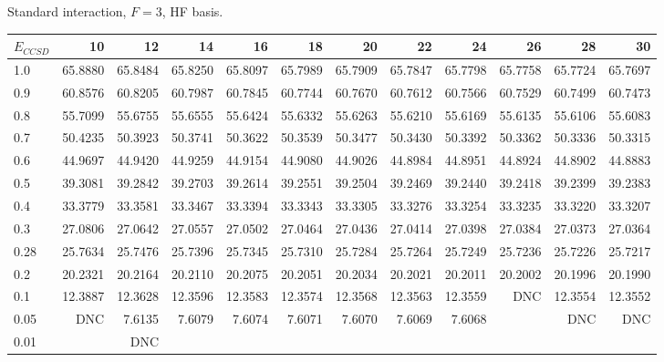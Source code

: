 \begin{landscape}
\begin{table}
\begin{center}
Standard interaction, $F=3$, HF basis.\\
\begin{tabular}{l|rrrrrrrrrrr}
\hline 
$E_{CCSD}$ & 10 & 12 & 14 & 16 & 18 & 20 & 22 & 24 & 26 & 28 & 30 \\
\hline \hline
1.0 & 65.8880 & 65.8484 & 65.8250 & 65.8097 & 65.7989 & 65.7909 & 65.7847 & 65.7798 & 65.7758 & 65.7724 & 65.7697 \\ 
0.9 & 60.8576 & 60.8205 & 60.7987 & 60.7845 & 60.7744 & 60.7670 & 60.7612 & 60.7566 & 60.7529 & 60.7499 & 60.7473 \\ 
0.8 & 55.7099 & 55.6755 & 55.6555 & 55.6424 & 55.6332 & 55.6263 & 55.6210 & 55.6169 & 55.6135 & 55.6106 & 55.6083 \\ 
0.7 & 50.4235 & 50.3923 & 50.3741 & 50.3622 & 50.3539 & 50.3477 & 50.3430 & 50.3392 & 50.3362 & 50.3336 & 50.3315 \\ 
0.6 & 44.9697 & 44.9420 & 44.9259 & 44.9154 & 44.9080 & 44.9026 & 44.8984 & 44.8951 & 44.8924 & 44.8902 & 44.8883 \\ 
0.5 & 39.3081 & 39.2842 & 39.2703 & 39.2614 & 39.2551 & 39.2504 & 39.2469 & 39.2440 & 39.2418 & 39.2399 & 39.2383 \\ 
0.4 & 33.3779 & 33.3581 & 33.3467 & 33.3394 & 33.3343 & 33.3305 & 33.3276 & 33.3254 & 33.3235 & 33.3220 & 33.3207 \\ 
0.3 & 27.0806 & 27.0642 & 27.0557 & 27.0502 & 27.0464 & 27.0436 & 27.0414 & 27.0398 & 27.0384 & 27.0373 & 27.0364 \\ 
0.28& 25.7634 & 25.7476 & 25.7396 & 25.7345 & 25.7310 & 25.7284 & 25.7264 & 25.7249 & 25.7236 & 25.7226 & 25.7217 \\ 
0.2 & 20.2321 & 20.2164 & 20.2110 & 20.2075 & 20.2051 & 20.2034 & 20.2021 & 20.2011 & 20.2002 & 20.1996 & 20.1990 \\ 
0.1 & 12.3887 & 12.3628 & 12.3596 & 12.3583 & 12.3574 & 12.3568 & 12.3563 & 12.3559 &  DNC    & 12.3554 & 12.3552 \\ 
0.05& DNC     &  7.6135 &  7.6079 &  7.6074 &  7.6071 &  7.6070 &  7.6069 &  7.6068 &         &     DNC &     DNC \\
0.01& 	   & DNC &  \\ 
\hline \hline
\end{tabular}
\end{center}
\end{table}
\end{landscape}



